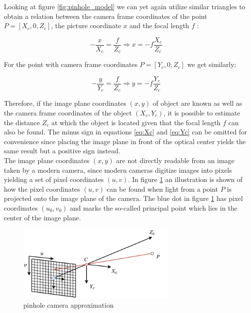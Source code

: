 Looking at figure \ref{fig:pinhole_model} we can yet again utilize similar triangles to obtain a relation between the camera frame coordinates of the point $P=[X_{c}, 0, Z_{c}]$, the picture coordinate $x$ and the focal length $f$ \cite{imageformationDTU}:

\begin{equation}
\label{eq:Xc}
    -\frac{x}{X_{c}} = \frac{f}{Z_{c}} \Rightarrow x = -f  \frac{X_{c}}{Z_{c}}
\end{equation}

For the point with camera frame coordinates $P = [Y_{c}, 0, Z_{c}]$ we get similarly:

\begin{equation}
\label{eq:Yc}
    -\frac{y}{Y_{c}} = \frac{f}{Z_{c}} \Rightarrow y = -f  \frac{Y_{c}}{Z_{c}}
\end{equation}

Therefore, if the image plane coordinates $(x,y)$ of object are known as well as the camera frame coordinates of the object $(X_{c}, Y_{c})$, it is possible to estimate the distance $Z_{c}$ at which the object is located given that the focal length $f$ can also be found. The minus sign in equations \ref{eq:Xc} and \ref{eq:Yc} can be omitted for convenience since placing the image plane in front of the optical center yields the same result but a positive sign instead.\\  

The image plane coordinates $(x,y)$ are not directly readable from an image taken by a modern camera, since modern cameras digitize images into pixels yielding a set of pixel coordinates $(u,v)$. In figure \ref{fig:uvframe} an illustration is shown of how the pixel coordinates $(u,v)$ can be found when light from a point $P$ is projected onto the image plane of the camera. The blue dot in figure \ref{fig:uvframe} has pixel coordinates $(u_{0},v_{0})$ and marks the so-called principal point which lies in the center of the image plane.

\begin{figure}[h]
    \centering
    \includegraphics[width=0.7\textwidth]{figures/reconstruction/uvframe.pdf}
    \caption{pinhole camera approximation}
    \label{fig:uvframe}
\end{figure}

